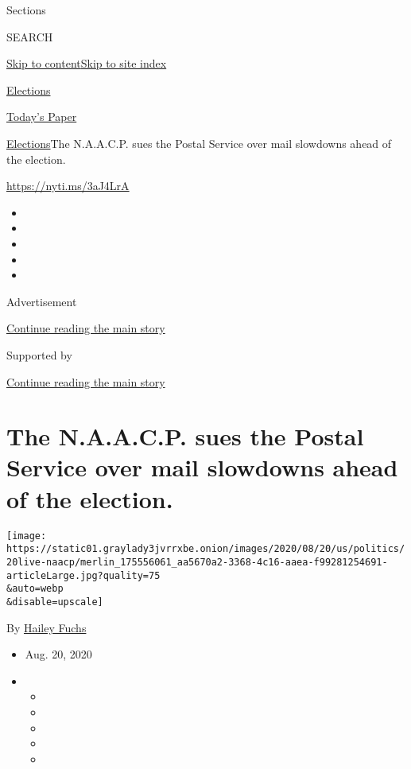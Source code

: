Sections

SEARCH

\protect\hyperlink{site-content}{Skip to
content}\protect\hyperlink{site-index}{Skip to site index}

\href{https://www.nytimes3xbfgragh.onion/news-event/2020-election}{Elections}

\href{https://myaccount.nytimes3xbfgragh.onion/auth/login?response_type=cookie\&client_id=vi}{}

\href{https://www.nytimes3xbfgragh.onion/section/todayspaper}{Today's
Paper}

\href{/news-event/2020-election}{Elections}\textbar{}The N.A.A.C.P. sues
the Postal Service over mail slowdowns ahead of the election.

\url{https://nyti.ms/3aJ4LrA}

\begin{itemize}
\item
\item
\item
\item
\item
\end{itemize}

Advertisement

\protect\hyperlink{after-top}{Continue reading the main story}

Supported by

\protect\hyperlink{after-sponsor}{Continue reading the main story}

\hypertarget{the-naacp-sues-the-postal-service-over-mail-slowdowns-ahead-of-the-election}{%
\section{The N.A.A.C.P. sues the Postal Service over mail slowdowns
ahead of the
election.}\label{the-naacp-sues-the-postal-service-over-mail-slowdowns-ahead-of-the-election}}

\texttt{[image: https://static01.graylady3jvrrxbe.onion/images/2020/08/20/us/politics/20live-naacp/merlin\_175556061\_aa5670a2-3368-4c16-aaea-f99281254691-articleLarge.jpg?quality=75\\\&auto=webp\\\&disable=upscale]}

By \href{https://www.nytimes3xbfgragh.onion/by/hailey-fuchs}{Hailey
Fuchs}

\begin{itemize}
\item
  Aug. 20, 2020
\item
  \begin{itemize}
  \item
  \item
  \item
  \item
  \item
  \end{itemize}
\end{itemize}

